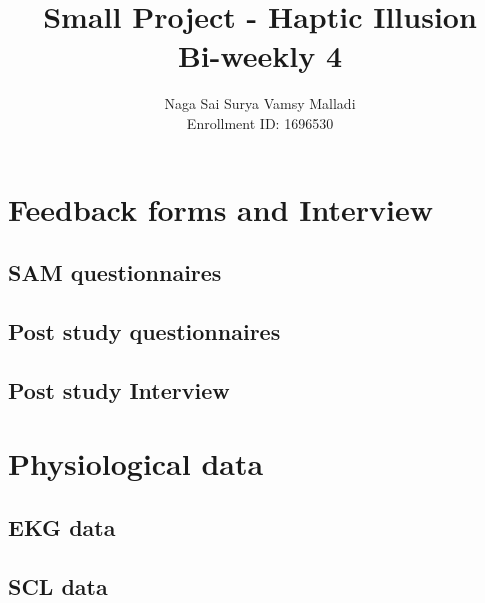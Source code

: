 \documentclass{article}
\begin{document}
\title{Small Project - Haptic Illusion \\ Bi-weekly 4}
\author{ Naga Sai Surya Vamsy Malladi\\
\small Enrollment ID: 1696530\\
}
\date{}
\maketitle


\section*{Feedback forms and Interview}
\subsection*{SAM questionnaires}
\subsection*{Post study questionnaires}
\subsection*{Post study Interview}


\section*{Physiological data}
\subsection*{EKG data}
\subsection*{SCL data}
\end{document}
